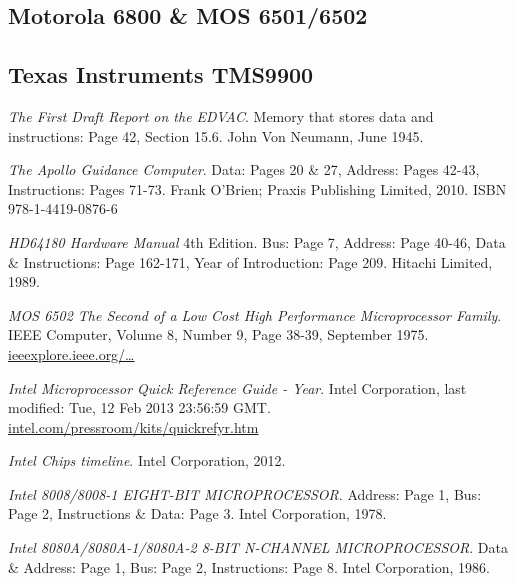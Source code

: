 \documentclass[twoside,twocolumn]{article}
\begin{document}
\subsection{Motorola 6800 \& MOS 6501/6502}

\subsection{Texas Instruments TMS9900}


\begin{thebibliography}{99} %

\textit{The First Draft Report on the EDVAC}.
Memory that stores data and instructions: Page 42, Section 15.6.
John Von Neumann, June 1945.

\textit{The Apollo Guidance Computer}.
Data: Pages 20 \& 27, Address: Pages 42-43, Instructions: Pages 71-73.
Frank O'Brien; Praxis Publishing Limited, 2010.
ISBN 978-1-4419-0876-6

\textit{HD64180 Hardware Manual} 4th Edition.
Bus: Page 7, Address: Page 40-46, Data \& Instructions: Page 162-171, Year of Introduction: Page 209.
Hitachi Limited, 1989.

\textit{MOS 6502 The Second of a Low Cost High Performance Microprocessor Family}.
IEEE Computer, Volume 8, Number 9, Page 38-39, September 1975.
\href{https://ieeexplore.ieee.org/stamp/stamp.jsp?tp=\&arnumber=1649550\&isnumber=34590}{ieeexplore.ieee.org/\ldots}

\textit{Intel Microprocessor Quick Reference Guide - Year}.
Intel Corporation, last modified: Tue, 12 Feb 2013 23:56:59 GMT.
\href{https://www.intel.com/pressroom/kits/quickrefyr.htm}{intel.com/pressroom/kits/quickrefyr.htm}

\textit{Intel Chips timeline}.
Intel Corporation, 2012.

\textit{Intel 8008/8008-1 EIGHT-BIT MICROPROCESSOR}.
Address: Page 1, Bus: Page 2, Instructions \& Data: Page 3.
Intel Corporation, 1978.

\textit{Intel 8080A/8080A-1/8080A-2 8-BIT N-CHANNEL MICROPROCESSOR}.
Data \& Address: Page 1, Bus: Page 2, Instructions: Page 8.
Intel Corporation, 1986.


\end{thebibliography}
\end{document}
